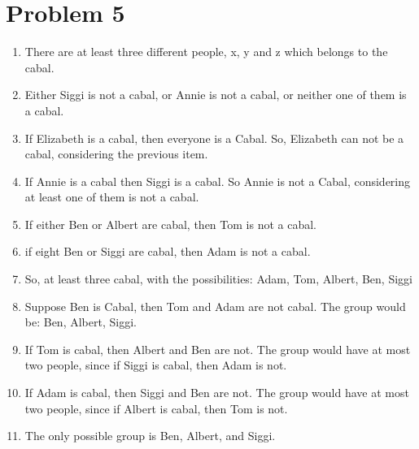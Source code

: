 \documentclass{article}
\begin{document}
\section*{Problem 5}
\begin{enumerate}[label=\alph*.]
  \setlength{\itemindent}{0pt}
  \item There are at least three different people, x, y and z which belongs to the cabal.
  \item Either Siggi is not a cabal, or Annie is not a cabal, or neither one of them is a cabal.
  \item If Elizabeth is a cabal, then everyone is a Cabal. So, Elizabeth can not be a cabal, considering the previous item.
  \item If Annie is a cabal then Siggi is a cabal. So Annie is not a Cabal, considering at least one of them is not a cabal.
  \item If either Ben or Albert are cabal, then Tom is not a cabal.
  \item if eight Ben or Siggi are cabal, then Adam is not a cabal.
  \item So, at least three cabal, with the possibilities: Adam, Tom, Albert, Ben, Siggi
  \item Suppose Ben is Cabal, then Tom and Adam are not cabal. The group would be: Ben, Albert, Siggi.
  \item If Tom is cabal, then Albert and Ben are not. The group would have at most two people, since if Siggi is cabal, then Adam is not.
  \item If Adam is cabal, then Siggi and Ben are not.  The group would have at most two people, since if Albert is cabal, then Tom is not.
  \item The only possible group is Ben, Albert, and Siggi.
\end{enumerate}
\end{document}
